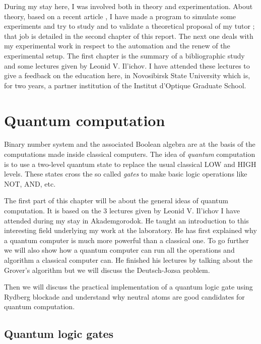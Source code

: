 \documentclass[twoside, open=right
]{scrreprt}
\begin{document}
\par During my stay here, I was involved both in theory and experimentation. About theory, based on a recent article \cite{Molmer}, I have made a program to simulate some experiments and try to study and to validate a theoretical proposal of my tutor \cite{Ilya}; that job is detailed in the second chapter of this report. The next one deals with my experimental work in respect to the automation and the renew of the experimental setup. The first chapter is the summary of a bibliographic study and some lectures given by Leonid V. Il'ichov. I have attended these lectures to give a feedback on the education here, in Novosibirsk State University which is, for two years, a partner institution of the Institut d'Optique Graduate School.


\chapter{Quantum computation}

\par Binary number system and the associated Boolean algebra are at the basis of the computations made inside classical computers. The idea of \emph{quantum} computation is to use a two-level quantum state to replace the usual classical LOW and HIGH levels. These states cross the so called \emph{gates} to make basic logic operations like NOT, AND, etc.

\par The first part of this chapter will be about the general ideas of quantum computation. It is based on the 3 lectures given by Leonid V. Il'ichov I have attended during my stay in Akademgorodok. He taught an introduction to this interesting field underlying my work at the laboratory. He has first explained why a quantum computer is much more powerful than a classical one. To go further we will also show how a quantum computer can run all the operations and algorithm a classical computer can. He finished his lectures by talking about the Grover's algorithm but we will discuss the Deutsch-Jozsa problem.

\par Then we will discuss the practical implementation of a quantum logic gate using Rydberg blockade and understand why neutral atoms are good candidates for quantum computation. 

\section{Quantum logic gates}
\end{document}
